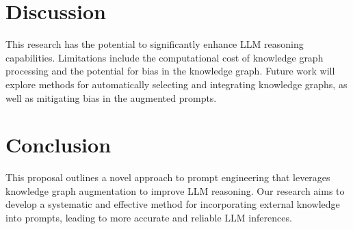 \documentclass{article}
\begin{document}
\section{Discussion}
This research has the potential to significantly enhance LLM reasoning capabilities. Limitations include the computational cost of knowledge graph processing and the potential for bias in the knowledge graph. Future work will explore methods for automatically selecting and integrating knowledge graphs, as well as mitigating bias in the augmented prompts.
\section{Conclusion}
This proposal outlines a novel approach to prompt engineering that leverages knowledge graph augmentation to improve LLM reasoning. Our research aims to develop a systematic and effective method for incorporating external knowledge into prompts, leading to more accurate and reliable LLM inferences.

\begin{thebibliography}{9}
\end{thebibliography}
\end{document}
